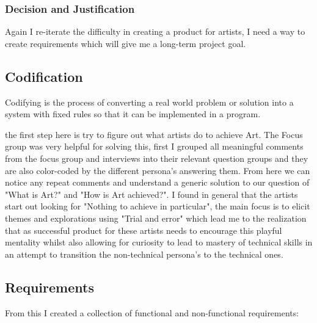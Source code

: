 \documentclass[a4paper]{report}
\begin{document}
\subsubsection{Decision and Justification}
Again I re-iterate the difficulty in creating a product for artists, I need a way to create requirements which will give me a long-term project goal.

\subsection{Codification}
Codifying is the process of converting a real world problem or solution into a system with fixed rules so that it can be implemented in a program. 

the first step here is try to figure out what artists do to achieve Art. The Focus group was very helpful for solving this, first I grouped all meaningful comments from the focus group and interviews into their relevant question groups and they are also color-coded by the different persona's answering them. From here we can notice any repeat comments and understand a generic solution to our question of "What is Art?" and "How is Art achieved?". I found in general that the artists start out looking for "Nothing to achieve in particular", the main focus is to elicit themes and explorations using "Trial and error" which lead me to the realization that as successful product for these artists needs to encourage this playful mentality whilst also allowing for curiosity to lead to mastery of technical skills in an attempt to transition the non-technical persona's to the technical ones. 

\subsection{Requirements}
From this I created a collection of functional and non-functional requirements:
\end{document}
